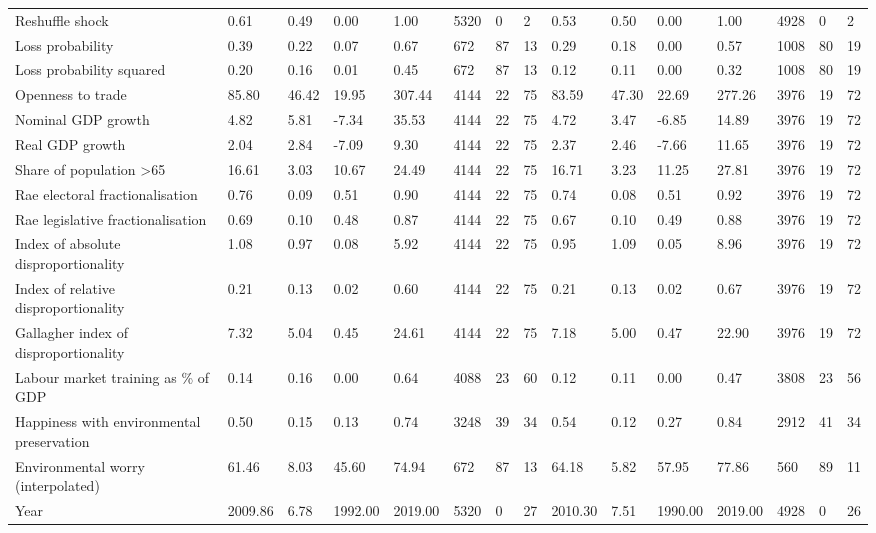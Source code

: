 \begin{longtable}{lllllllllllllll}
Reshuffle shock & 0.61 & 0.49 & 0.00 & 1.00 & 5320 & 0 & 2 & 0.53 & 0.50 & 0.00 & 1.00 & 4928 & 0 & 2\\
\addlinespace
Loss probability & 0.39 & 0.22 & 0.07 & 0.67 & 672 & 87 & 13 & 0.29 & 0.18 & 0.00 & 0.57 & 1008 & 80 & 19\\
Loss probability squared & 0.20 & 0.16 & 0.01 & 0.45 & 672 & 87 & 13 & 0.12 & 0.11 & 0.00 & 0.32 & 1008 & 80 & 19\\
Openness to trade & 85.80 & 46.42 & 19.95 & 307.44 & 4144 & 22 & 75 & 83.59 & 47.30 & 22.69 & 277.26 & 3976 & 19 & 72\\
Nominal GDP growth & 4.82 & 5.81 & -7.34 & 35.53 & 4144 & 22 & 75 & 4.72 & 3.47 & -6.85 & 14.89 & 3976 & 19 & 72\\
Real GDP growth & 2.04 & 2.84 & -7.09 & 9.30 & 4144 & 22 & 75 & 2.37 & 2.46 & -7.66 & 11.65 & 3976 & 19 & 72\\
\addlinespace
Share of population >65 & 16.61 & 3.03 & 10.67 & 24.49 & 4144 & 22 & 75 & 16.71 & 3.23 & 11.25 & 27.81 & 3976 & 19 & 72\\
Rae electoral fractionalisation & 0.76 & 0.09 & 0.51 & 0.90 & 4144 & 22 & 75 & 0.74 & 0.08 & 0.51 & 0.92 & 3976 & 19 & 72\\
Rae legislative fractionalisation & 0.69 & 0.10 & 0.48 & 0.87 & 4144 & 22 & 75 & 0.67 & 0.10 & 0.49 & 0.88 & 3976 & 19 & 72\\
Index of absolute disproportionality & 1.08 & 0.97 & 0.08 & 5.92 & 4144 & 22 & 75 & 0.95 & 1.09 & 0.05 & 8.96 & 3976 & 19 & 72\\
Index of relative disproportionality & 0.21 & 0.13 & 0.02 & 0.60 & 4144 & 22 & 75 & 0.21 & 0.13 & 0.02 & 0.67 & 3976 & 19 & 72\\
\addlinespace
Gallagher index of disproportionality & 7.32 & 5.04 & 0.45 & 24.61 & 4144 & 22 & 75 & 7.18 & 5.00 & 0.47 & 22.90 & 3976 & 19 & 72\\
Labour market training as \% of GDP & 0.14 & 0.16 & 0.00 & 0.64 & 4088 & 23 & 60 & 0.12 & 0.11 & 0.00 & 0.47 & 3808 & 23 & 56\\
Happiness with environmental preservation & 0.50 & 0.15 & 0.13 & 0.74 & 3248 & 39 & 34 & 0.54 & 0.12 & 0.27 & 0.84 & 2912 & 41 & 34\\
Environmental worry (interpolated) & 61.46 & 8.03 & 45.60 & 74.94 & 672 & 87 & 13 & 64.18 & 5.82 & 57.95 & 77.86 & 560 & 89 & 11\\
Year & 2009.86 & 6.78 & 1992.00 & 2019.00 & 5320 & 0 & 27 & 2010.30 & 7.51 & 1990.00 & 2019.00 & 4928 & 0 & 26\\
\bottomrule
\end{longtable}
